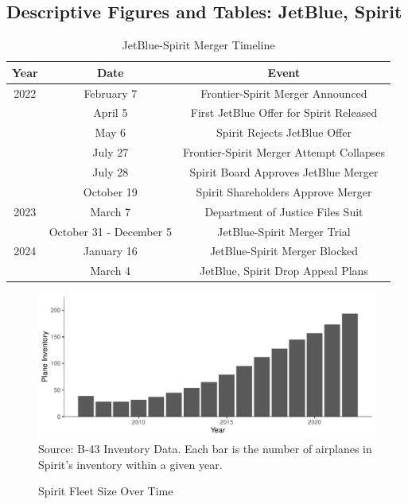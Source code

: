 \documentclass{article}
\let\Oldsubsection\subsection
\renewcommand{\subsection}{\FloatBarrier\Oldsubsection}
\begin{document}
\begin{appendices}
\FloatBarrier
	
	\subsection{Descriptive Figures and Tables: JetBlue, Spirit}

	
	\begin{table}[h]
		\caption{JetBlue-Spirit Merger Timeline}
		\label{tab:JetBlue_Spirit_Timeline}
		\begin{center}
			\begin{tabular}{ccc}
				\hline
				Year & Date & Event \\
				\hline
				2022 & February 7 & Frontier-Spirit Merger Announced \\
				& April 5 &  First JetBlue Offer for Spirit Released\\
				& May 6 & Spirit Rejects JetBlue Offer \\
				& July 27 &  Frontier-Spirit Merger Attempt Collapses\\
				& July 28 &  Spirit Board Approves JetBlue Merger\\
				& October 19 & Spirit Shareholders Approve Merger \\
				\hline
				2023 & March 7 &  Department of Justice Files Suit\\
				& October 31 - December 5 &  JetBlue-Spirit Merger Trial \\
				\hline
				2024 & January 16 & JetBlue-Spirit Merger Blocked \\
				& March 4 & JetBlue, Spirit Drop Appeal Plans \\
			\end{tabular}
		\end{center}
	\end{table}

	\begin{figure}
	\caption{Spirit Fleet Size Over Time}
	\label{fig:Spirit_fleet}
	\includegraphics[width = \linewidth]{Spirit_Planes.pdf}
	\footnotesize{Source: B-43 Inventory Data. Each bar is the number of airplanes in Spirit's inventory within a given year. }
\end{figure}


\end{appendices}
\end{document}
